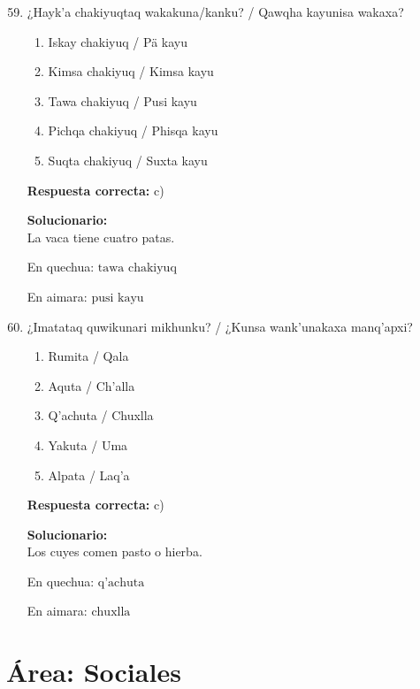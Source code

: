 \begin{enumerate}
	\setcounter{enumi}{58}
	
	\item ¿Hayk'a chakiyuqtaq wakakuna/kanku? / Qawqha kayunisa wakaxa?
	\begin{enumerate}[label=\alph*)]
		\item Iskay chakiyuq / Pä kayu
		\item Kimsa chakiyuq / Kimsa kayu
		\item Tawa chakiyuq / Pusi kayu
		\item Pichqa chakiyuq / Phisqa kayu
		\item Suqta chakiyuq / Suxta kayu
	\end{enumerate}
	\textbf{Respuesta correcta:} c)
	
	\vspace{2mm}
	\textbf{Solucionario:}\\
	La vaca tiene cuatro patas.
	
	En quechua:
	$ \text{tawa chakiyuq} $
	
	En aimara:
	$ \text{pusi kayu} $
	
	\vspace{6mm}
	
	\item ¿Imatataq quwikunari mikhunku? / ¿Kunsa wank'unakaxa manq'apxi?
	\begin{enumerate}[label=\alph*)]
		\item Rumita / Qala
		\item Aquta / Ch'alla
		\item Q'achuta / Chuxlla
		\item Yakuta / Uma
		\item Alpata / Laq'a
	\end{enumerate}
	\textbf{Respuesta correcta:} c)
	
	\vspace{2mm}
	\textbf{Solucionario:}\\
	Los cuyes comen pasto o hierba.
	
	En quechua:
	$ \text{q'achuta} $
	
	En aimara:
	$ \text{chuxlla} $
	
	\vspace{6mm}
	
\end{enumerate}




\section*{Área: Sociales}



